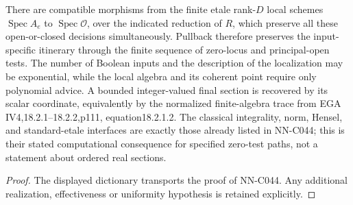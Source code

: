 \begin{geometricstatement}[NN-C044]
There are compatible morphisms from the finite etale rank-$D$ local
schemes $\operatorname{Spec}A_e$ to
$\operatorname{Spec}\mathcal O$, over the indicated reduction of $R$,
which preserve all these open-or-closed decisions simultaneously. Pullback
therefore preserves the input-specific itinerary through the finite
sequence of zero-locus and principal-open tests. The number of Boolean
inputs and the description of the localization may be exponential,
while the local algebra and its coherent point require only polynomial
advice. A bounded integer-valued final section is recovered by its scalar
coordinate, equivalently by the normalized finite-algebra trace from
EGA IV4,18.2.1--18.2.2,p111, equation18.2.1.2. The classical integrality,
norm, Hensel, and standard-etale interfaces are exactly those already
listed in NN-C044; this is their stated computational consequence for
specified zero-test paths, not a statement about ordered real sections.
\end{geometricstatement}
\begin{proof} The displayed dictionary transports the proof of NN-C044. Any additional realization, effectiveness or uniformity hypothesis is retained explicitly.\end{proof}


